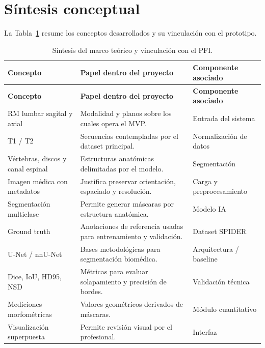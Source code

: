 \section{Síntesis conceptual}

La Tabla~\ref{tab:marco-teorico-sintesis} resume los conceptos desarrollados y su vinculación con el prototipo.

\begingroup
\small
\sloppy
\setlength{\emergencystretch}{3em}
\setlength{\tabcolsep}{3pt}
\setlength{\LTleft}{0pt}
\setlength{\LTright}{0pt}
\renewcommand{\arraystretch}{1.15}
\begin{longtable}{|>{\raggedright\arraybackslash}p{}|>{\raggedright\arraybackslash}p{}|>{\raggedright\arraybackslash}p{}|}
\caption{Síntesis del marco teórico y vinculación con el PFI.}
\label{tab:marco-teorico-sintesis}\\
\hline
\textbf{Concepto} & \textbf{Papel dentro del proyecto} & \textbf{Componente asociado} \\
\hline
\endfirsthead
\hline
\textbf{Concepto} & \textbf{Papel dentro del proyecto} & \textbf{Componente asociado} \\
\hline
\endhead
RM lumbar sagital y axial & Modalidad y planos sobre los cuales opera el MVP. & Entrada del sistema \\
\hline
T1 / T2 & Secuencias contempladas por el dataset principal. & Normalización de datos \\
\hline
Vértebras, discos y canal espinal & Estructuras anatómicas delimitadas por el modelo. & Segmentación \\
\hline
Imagen médica con metadatos & Justifica preservar orientación, espaciado y resolución. & Carga y preprocesamiento \\
\hline
Segmentación multiclase & Permite generar máscaras por estructura anatómica. & Modelo IA \\
\hline
Ground truth & Anotaciones de referencia usadas para entrenamiento y validación. & Dataset SPIDER \\
\hline
U-Net / nnU-Net & Bases metodológicas para segmentación biomédica. & Arquitectura / baseline \\
\hline
Dice, IoU, HD95, NSD & Métricas para evaluar solapamiento y precisión de bordes. & Validación técnica \\
\hline
Mediciones morfométricas & Valores geométricos derivados de máscaras. & Módulo cuantitativo \\
\hline
Visualización superpuesta & Permite revisión visual por el profesional. & Interfaz \\

\end{longtable}
